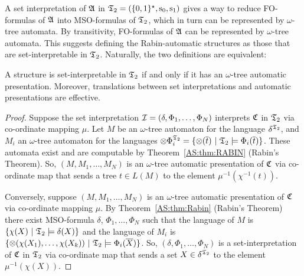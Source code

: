 A set interpretation of $\mathfrak{A}$ in $\mathfrak{T}_2 = \mbox{$(\{0,1\}^{\star},\mathrm{s}_0, \mathrm{s}_1)$}$ gives a way to reduce FO-formulas of $\mathfrak{A}$ into MSO-formulas of $\mathfrak{T}_2$, which in turn can be represented by  $\omega$-tree automata. By transitivity, FO-formulas of $\mathfrak{A}$ can be represented by $\omega$-tree automata. This suggests defining the Rabin-automatic structures as those that are set-interpretable in $\mathfrak{T}_2$. Naturally, the two definitions are equivalent:

\begin{proposition}\cite{BlGr00}
A structure is set-interpretable in $\mathfrak{T}_2$ if and only if it has an $\omega$-tree automatic presentation. 
Moreover, translations between set interpretations and automatic presentations are effective.
\end{proposition}

\begin{proof}
Suppose the set interpretation ${\mathcal I} = (\delta, \Phi_1, \dots, \Phi_N)$ interprets $\mathfrak{C}$ in $\mathfrak{T}_2$ via co-ordinate mapping $\mu$. Let $M$ be an $\omega$-tree automaton for the language $\delta^{\mathfrak{T}_2}$, and $M_i$ an $\omega$-tree automaton for the languages $\otimes \Phi_i^{\mathfrak{T}_2} = \{\otimes(\mbox{$\overline {t}$}) \ \vert \  \mathfrak{T}_2 \models \Phi_i(\mbox{$\overline {t}$})\}$. These automata exist and are computable by Theorem~\ref{AS:thm:RABIN} (Rabin's Theorem). So, $(M,M_1, \dots, M_N)$ is an $\omega$-tree automatic presentation of $\mathfrak{C}$ via co-ordinate map that sends a tree $t \in L(M)$ to the element $\mu^{-1}(\chi^{-1}(t))$.

Conversely, suppose $(M,M_1, \dots, M_N)$ is an $\omega$-tree automatic presentation of $\mathfrak{C}$ via co-ordinate mapping $\mu$. By Theorem~\ref{AS:thm:Rabin} (Rabin's Theorem) there exist MSO-formula $\delta$, $\Phi_1, \dots, \Phi_N$ such that the language of $M$ is $\{\chi(X) \ \vert \  \mathfrak{T}_2 \models \delta(X)\}$ and the language of $M_i$ is $\{\otimes(\chi({X_1}),\dots,\chi({X_k})) \ \vert \  \mathfrak{T}_2 \models \Phi_i(\mbox{$\overline {X}$})\}$. So, $(\delta,\Phi_1, \dots, \Phi_N)$ is a set-interpretation of $\mathfrak{C}$ in $\mathfrak{T}_2$ via co-ordinate map that sends a set $X \in \delta^{\mathfrak{T}_2}$ to the element $\mu^{-1}(\chi(X))$.
\end{proof}







